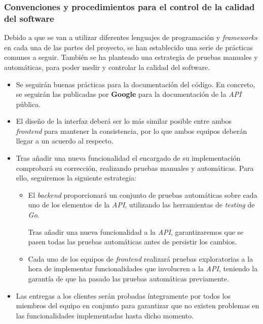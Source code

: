 \documentclass[11pt, a4paper, titlepage]{article}
\begin{document}
\subsubsection{Convenciones y procedimientos para el control de la calidad del software}

Debido a que se van a utilizar diferentes lenguajes de programación y \textit{frameworks} en cada una de las partes del proyecto, se han establecido una serie de prácticas comunes a seguir. También se ha planteado una estrategia de pruebas manuales y automáticas, para poder medir y controlar la calidad del software.

\begin{itemize}
    \item Se seguirán buenas prácticas para la documentación del código. En concreto, se seguirán las publicadas por \textbf{Google}\cite{documentaciongoogle} para la documentación de la \textit{API} pública.

    \item El diseño de la interfaz deberá ser lo más similar posible entre ambos \textit{frontend} para mantener la consistencia, por lo que ambos equipos deberán llegar a un acuerdo al respecto. 
    \item Tras añadir una nueva funcionalidad el encargado de su implementación comprobará su corrección, realizando pruebas manuales y automáticas. Para ello, seguiremos la siguiente estrategia:
    \begin{itemize}
        \item El \textit{backend} proporcionará un conjunto de pruebas automáticas sobre cada uno de los elementos de la \textit{API}, utilizando las herramientas de \textit{testing} de \textit{Go}. 

        Tras añadir una nueva funcionalidad a la \textit{API}, garantizaremos que se pasen todas las pruebas automáticas antes de persistir los cambios.

        \item Cada uno de los equipos de \textit{frontend} realizará pruebas exploratorias a la hora de implementar funcionalidades que involucren a la \textit{API}, teniendo la garantía de que ha pasado las pruebas automáticas previamente.
        \end{itemize}


    \item Las entregas a los clientes serán probadas íntegramente por todos los miembros del equipo en conjunto para garantizar que no existen problemas en las funcionalidades implementadas hasta dicho momento.


\end{itemize}
\end{document}
